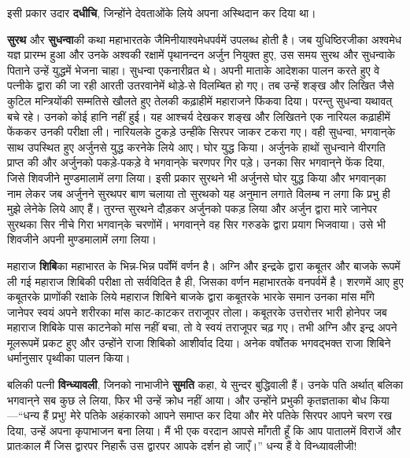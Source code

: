 \begin{sloppypar}\justifying{}
इसी प्रकार उदार \textbf{दधीचि}, जिन्होंने देवताओंके लिये अपना अस्थिदान कर दिया था।
\end{sloppypar}
\begin{sloppypar}\justifying{}
\textbf{सुरथ} और \textbf{सुधन्वा}की कथा महाभारतके जैमिनीयाश्व\-मेधपर्वमें उपलब्ध होती है। जब युधिष्ठिरजीका अश्वमेध यज्ञ प्रारम्भ हुआ और उनके अश्वकी रक्षामें पृथानन्दन अर्जुन नियुक्त हुए, उस समय सुरथ और सुधन्वाके पिताने उन्हें युद्धमें भेजना चाहा। सुधन्वा एकनारीव्रत थे। अपनी माताके आदेशका पालन करते हुए वे पत्नीके द्वारा की जा रही आरती उतरवानेमें थोड़े-से विलम्बित हो गए। तब उन्हें शङ्ख और लिखित जैसे कुटिल मन्त्रियोंकी सम्मतिसे खौलते हुए तेलकी कढ़ाहीमें महाराजने फिंकवा दिया। परन्तु सुधन्वा यथावत् बचे रहे। उनको कोई हानि नहीं हुई। यह आश्चर्य देखकर शङ्ख और लिखितने एक नारियल कढ़ाहीमें फेंककर उनकी परीक्षा ली। नारियलके टुकड़े उन्हींके सिरपर जाकर टकरा गए। वही सुधन्वा, भगवान्‌के साथ उपस्थित हुए अर्जुनसे युद्ध करनेके लिये आए। घोर युद्ध किया। अर्जुनके हाथों सुधन्वाने वीरगति प्राप्त की और अर्जुनको पकड़े-पकड़े वे भगवान्‌के चरणपर गिर पड़े। उनका सिर भगवान्‌ने फेंक दिया, जिसे शिवजीने मुण्डमालामें लगा लिया। इसी प्रकार सुरथने भी अर्जुनसे घोर युद्ध किया और भगवान्‌का नाम लेकर जब अर्जुनने सुरथपर बाण चलाया तो सुरथको यह अनुमान लगाते विलम्ब न लगा कि प्रभु ही मुझे लेनेके लिये आए हैं। तुरन्त सुरथने दौड़कर अर्जुनको पकड़ लिया और अर्जुन द्वारा मारे जानेपर सुरथका सिर नीचे गिरा भगवान्‌के चरणोंमें। भगवान्‌ने वह सिर गरुडके द्वारा प्रयाग भिजवाया। उसे भी शिवजीने अपनी मुण्डमालामें लगा लिया।
\end{sloppypar}
\begin{sloppypar}\justifying{}
महाराज \textbf{शिबि}का महाभारत के भिन्न-भिन्न पर्वोंमें वर्णन है। अग्नि और इन्द्रके द्वारा कबूतर और बाजके रूपमें ली गई महाराज शिबिकी परीक्षा तो सर्वविदित है ही, जिसका वर्णन महाभारतके वनपर्वमें है। शरणमें आए हुए कबूतरके प्राणोंकी रक्षाके लिये महाराज शिबिने बाजके द्वारा कबूतरके भारके समान उनका मांस माँगे जानेपर स्वयं अपने शरीरका मांस काट-काटकर तराजूपर तोला। कबूतरके उत्तरोत्तर भारी होनेपर जब महाराज शिबिके पास काटनेको मांस नहीं बचा, तो वे स्वयं तराजूपर चढ़ गए। तभी अग्नि और इन्द्र अपने मूलरूपमें प्रकट हुए और उन्होंने राजा शिबिको आशीर्वाद दिया। अनेक वर्षोंतक भगवद्भक्त राजा शिबिने धर्मानुसार पृथ्वीका पालन किया।
\end{sloppypar}
\begin{sloppypar}\justifying{}
बलिकी पत्नी \textbf{विन्ध्यावली}, जिनको नाभाजीने \textbf{सुमति} कहा, ये सुन्दर बुद्धिवाली हैं। उनके पति अर्थात् बलिका भगवान्‌ने सब कुछ ले लिया, फिर भी उन्हें क्रोध नहीं आया। और उन्होंने प्रभुकी कृतज्ञताका बोध किया—“धन्य हैं प्रभु! मेरे पतिके अहंकारको आपने समाप्त कर दिया और मेरे पतिके सिरपर आपने चरण रख दिया, उन्हें अपना कृपा\-भाजन बना लिया। मैं भी एक वरदान आपसे माँगती हूँ कि आप पातालमें विराजें और प्रातःकाल मैं जिस द्वारपर निहारूँ उस द्वारपर आपके दर्शन हो जाएँ।” धन्य हैं वे विन्ध्यावलीजी!
\end{sloppypar}
